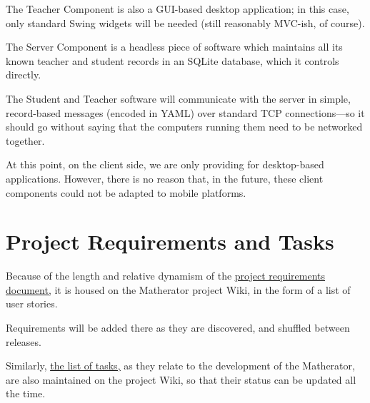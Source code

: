 \documentclass[11pt,a4paper,twoside]{report}
\begin{document}
The Teacher Component is also a GUI-based desktop application; in this case, only standard Swing widgets will be needed (still reasonably MVC-ish, of course).

The Server Component is a headless piece of software which maintains all its known teacher and student records in an SQLite database, which it controls directly.

The Student and Teacher software will communicate with the server in simple, record-based messages (encoded in YAML) over standard TCP connections—so it should go without saying that the computers running them need to be networked together.

At this point, on the client side, we are only providing for desktop-based applications. However, there is no reason that, in the future, these client components could not be adapted to mobile platforms.













\chapter{Project Requirements and Tasks}

Because of the length and relative dynamism of the \href{https://github.com/talusbb/matherator-extreme/wiki/User-Stories}{ \underline{project requirements document,}} it is housed on the Matherator project Wiki, in the form of a list of user stories.

Requirements will be added there as they are discovered, and shuffled between releases.

Similarly, \href{https://github.com/talusbb/matherator-extreme/wiki/Tasks}{ \underline{the list of tasks,}} as they relate to the development of the Matherator, are also maintained on the project Wiki, so that their status can be updated all the time.
\end{document}
